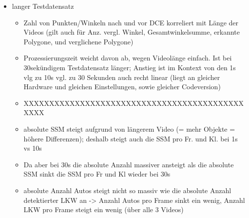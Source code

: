 {\begin{itemize}
		\item langer Testdatensatz
		\begin{itemize}
			\item Zahl von Punkten/Winkeln nach und vor DCE korreliert mit Länge der Videos (gilt auch für Anz. vergl. Winkel, Gesamtwinkelsumme, erkannte Polygone, und verglichene Polygone)
			\item Prozessierungszeit weicht davon ab, wegen Videolänge einfach. Ist bei 30sekündigem Testdatensatz länger; Anstieg ist im Kontext von den 1s vlg zu 10s vgl. zu 30 Sekunden auch recht linear (liegt an gleicher Hardware und gleichen Einstellungen, sowie gleicher Codeversion)
			\item XXXXXXXXXXXXXXXXXXXXXXXXXXXXXXXXXXXXXXXXXXXXXXX
			\item absolute SSM steigt aufgrund von längerem Video (= mehr Objekte = höhere Differenzen); deshalb steigt auch die SSM pro Fr. und Kl. bei 1s vs 10s
			\item Da aber bei 30s die absolute Anzahl massiver ansteigt als die absolute SSM sinkt die SSM pro Fr und Kl wieder bei 30s
			\item absolute Anzahl Autos steigt nicht so massiv wie die absolute Anzahl detektierter LKW an -> Anzahl Autos pro Frame sinkt ein wenig, Anzahl LKW pro Frame steigt ein wenig (über alle 3 Videos)
		\end{itemize}
	\end{itemize}



}
		



